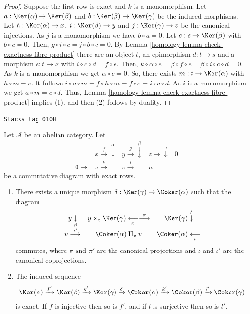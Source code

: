 \begin{proof}

Suppose the first row is exact and $k$ is a monomorphism. Let
$a:\Ker(\alpha)\to\Ker(\beta)$ and
$b:\Ker(\beta)\to\Ker(\gamma)$ be the induced morphisms.
Let $h:\Ker(\alpha)\to x$, $i:\Ker(\beta)\to y$ and
$j:\Ker(\gamma)\to z$ be the canonical injections. As $j$ is
a monomorphism we have $b\circ a=0$. Let $c:s\to\Ker(\beta)$
with $b\circ c=0$. Then, $g\circ i\circ c=j\circ b\circ c=0$. By
Lemma \ref{homology-lemma-check-exactness-fibre-product} there are an object $t$, an
epimorphism $d:t\to s$ and a morphism $e:t\to x$ with
$i\circ c\circ d=f\circ e$. Then,
$k\circ \alpha\circ e=\beta\circ f\circ e=\beta\circ i\circ c\circ d=0$.
As $k$ is a monomorphism we get $\alpha\circ e=0$. So, there exists
$m:t\to\Ker(\alpha)$ with $h\circ m=e$. It follows
$i\circ a\circ m=f\circ h\circ m=f\circ e=i\circ c\circ d$.
As $i$ is a monomorphism we get $a\circ m=c\circ d$. Thus,
Lemma \ref{homology-lemma-check-exactness-fibre-product} implies (1), and then
(2) follows by duality.
\end{proof}

\begin{lemma}[Snake]
\label{homology-lemma-snake}
\href{https://stacks.math.columbia.edu/tag/010H}{\texttt{Stacks tag 010H}}

Let $\mathcal{A}$ be an abelian category. Let
$$
\begin{array}{ccccc} & x \overset{f}{\longrightarrow}\overset{\alpha}{\downarrow} & y \overset{g}{\longrightarrow}\overset{\beta}{\downarrow} & z \longrightarrow\overset{\gamma}{\downarrow} & 0 \\ 0 \longrightarrow & u \overset{k}{\longrightarrow} & v \overset{l}{\longrightarrow} & w & \end{array}
$$
be a commutative diagram with exact rows.
\begin{enumerate}
\item There exists a unique morphism
$\delta : \Ker(\gamma) \to \Coker(\alpha)$
such that the diagram
$$
\begin{array}{ccc}y \underset{\beta}{\downarrow} & y \times_z \Ker(\gamma) \underset{\pi'}{\longleftarrow}\overset{\pi}{\longrightarrow} & \Ker(\gamma) \overset{\delta}{\downarrow} \\ v \overset{\iota'}{\longrightarrow} & \Coker(\alpha) \amalg_u v & \Coker(\alpha) \underset{\iota}{\longleftarrow}\end{array}
$$
commutes, where $\pi$ and $\pi'$ are the canonical projections
and $\iota$ and $\iota'$ are the canonical coprojections.
\item The induced sequence
$$
\Ker(\alpha) \xrightarrow{f'} \Ker(\beta) \xrightarrow{g'}
\Ker(\gamma) \xrightarrow{\delta} \Coker(\alpha) \xrightarrow{k'}
\Coker(\beta) \xrightarrow{l'} \Coker(\gamma)
$$
is exact. If $f$ is injective then so is $f'$, and if $l$ is
surjective then so is $l'$.
\end{enumerate}
\end{lemma}

